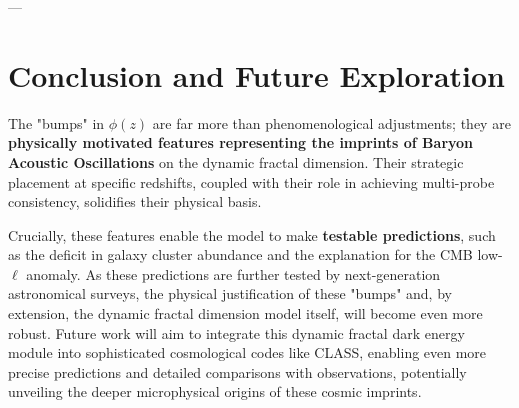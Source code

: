 \documentclass{article}
\begin{document}
---

\section{Conclusion and Future Exploration}

The "bumps" in $\phi(z)$ are far more than phenomenological adjustments; they are \textbf{physically motivated features representing the imprints of Baryon Acoustic Oscillations} on the dynamic fractal dimension. Their strategic placement at specific redshifts, coupled with their role in achieving multi-probe consistency, solidifies their physical basis.

Crucially, these features enable the model to make \textbf{testable predictions}, such as the deficit in galaxy cluster abundance and the explanation for the CMB low-$\ell$ anomaly. As these predictions are further tested by next-generation astronomical surveys, the physical justification of these "bumps" and, by extension, the dynamic fractal dimension model itself, will become even more robust. Future work will aim to integrate this dynamic fractal dark energy module into sophisticated cosmological codes like CLASS, enabling even more precise predictions and detailed comparisons with observations, potentially unveiling the deeper microphysical origins of these cosmic imprints.
\end{document}
